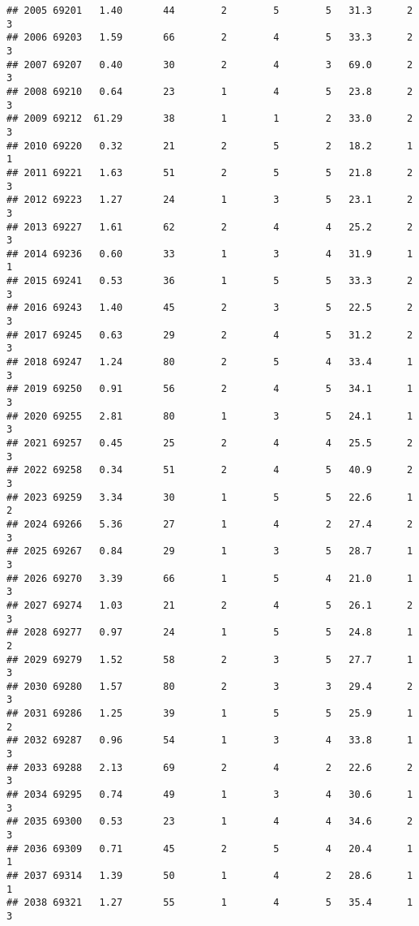\documentclass[
]{article}
\begin{document}
\begin{verbatim}
## 2005 69201   1.40       44        2        5        5   31.3      2      3
## 2006 69203   1.59       66        2        4        5   33.3      2      3
## 2007 69207   0.40       30        2        4        3   69.0      2      3
## 2008 69210   0.64       23        1        4        5   23.8      2      3
## 2009 69212  61.29       38        1        1        2   33.0      2      3
## 2010 69220   0.32       21        2        5        2   18.2      1      1
## 2011 69221   1.63       51        2        5        5   21.8      2      3
## 2012 69223   1.27       24        1        3        5   23.1      2      3
## 2013 69227   1.61       62        2        4        4   25.2      2      3
## 2014 69236   0.60       33        1        3        4   31.9      1      1
## 2015 69241   0.53       36        1        5        5   33.3      2      3
## 2016 69243   1.40       45        2        3        5   22.5      2      3
## 2017 69245   0.63       29        2        4        5   31.2      2      3
## 2018 69247   1.24       80        2        5        4   33.4      1      3
## 2019 69250   0.91       56        2        4        5   34.1      1      3
## 2020 69255   2.81       80        1        3        5   24.1      1      3
## 2021 69257   0.45       25        2        4        4   25.5      2      3
## 2022 69258   0.34       51        2        4        5   40.9      2      3
## 2023 69259   3.34       30        1        5        5   22.6      1      2
## 2024 69266   5.36       27        1        4        2   27.4      2      3
## 2025 69267   0.84       29        1        3        5   28.7      1      3
## 2026 69270   3.39       66        1        5        4   21.0      1      3
## 2027 69274   1.03       21        2        4        5   26.1      2      3
## 2028 69277   0.97       24        1        5        5   24.8      1      2
## 2029 69279   1.52       58        2        3        5   27.7      1      3
## 2030 69280   1.57       80        2        3        3   29.4      2      3
## 2031 69286   1.25       39        1        5        5   25.9      1      2
## 2032 69287   0.96       54        1        3        4   33.8      1      3
## 2033 69288   2.13       69        2        4        2   22.6      2      3
## 2034 69295   0.74       49        1        3        4   30.6      1      3
## 2035 69300   0.53       23        1        4        4   34.6      2      3
## 2036 69309   0.71       45        2        5        4   20.4      1      1
## 2037 69314   1.39       50        1        4        2   28.6      1      1
## 2038 69321   1.27       55        1        4        5   35.4      1      3

\end{verbatim}
\end{document}
